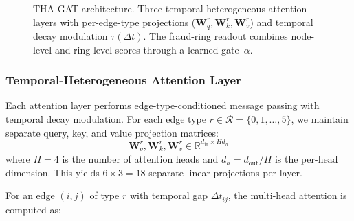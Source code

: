 \documentclass[journal]{IEEEtran}
\begin{document}
\begin{figure}[!t]
\centering
{}
\caption{THA-GAT architecture. Three temporal-heterogeneous attention layers with per-edge-type projections ($\mathbf{W}_q^r, \mathbf{W}_k^r, \mathbf{W}_v^r$) and temporal decay modulation $\tau(\Delta t)$. The fraud-ring readout combines node-level and ring-level scores through a learned gate~$\alpha$.}
\label{fig:thagat}
\end{figure}

\subsubsection{Temporal-Heterogeneous Attention Layer}

Each attention layer performs edge-type-conditioned message passing with temporal decay modulation. For each edge type $r \in \mathcal{R} = \{0, 1, \dots, 5\}$, we maintain separate query, key, and value projection matrices:
\begin{equation}
\mathbf{W}_q^r, \mathbf{W}_k^r, \mathbf{W}_v^r \in \mathbb{R}^{d_{\text{in}} \times Hd_h}
\end{equation}
where $H = 4$ is the number of attention heads and $d_h = d_{\text{out}} / H$ is the per-head dimension. This yields $6 \times 3 = 18$ separate linear projections per layer.

For an edge $(i, j)$ of type $r$ with temporal gap $\Delta t_{ij}$, the multi-head attention is computed as:
\end{document}
